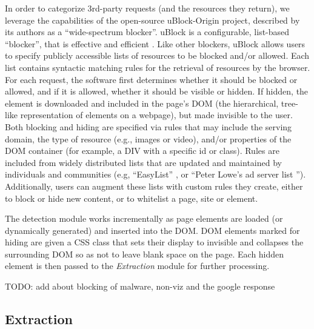 \documentclass[conference]{IEEEtran}
\begin{document}
In order to categorize 3rd-party requests (and the resources they return), we leverage the capabilities of the open-source uBlock-Origin \cite{Gorhill} project, described by its authors as a ``wide-spectrum blocker''. uBlock is a configurable, list-based ``blocker'', that is effective and efficient \cite{Wills}. Like other blockers, uBlock allows users to specify publicly accessible lists of resources to be blocked and/or allowed. Each list contains syntactic matching rules for the retrieval of resources by the browser. For each request, the software first determines whether it should be blocked or allowed, and if it is allowed, whether it should be visible or hidden. If hidden, the element is downloaded and included in the page's DOM (the hierarchical, tree-like representation of elements on a webpage), but made invisible to the user. Both blocking and hiding are specified via rules that may include the serving domain, the type of resource (e.g., images or video), and/or properties of the DOM container (for example, a DIV with a specific id or class). Rules are included from widely distributed lists that are updated and maintained by individuals and communities (e.g, ``EasyList'' \cite{EasyList}, or ``Peter Lowe's ad server list \cite{Lowe}''). Additionally, users can augment these lists with custom rules they create, either to block or hide new content, or to whitelist a page, site or element.

The detection module works incrementally as page elements are loaded (or dynamically generated) and inserted into the DOM. DOM elements marked for hiding are given a CSS class that sets their display to invisible and collapses the surrounding DOM so as not to leave blank space on the page. Each hidden element is then passed to the \emph{Extraction} module for further processing.

TODO: add about blocking of malware, non-viz and the google response

\subsection{Extraction}
\end{document}
